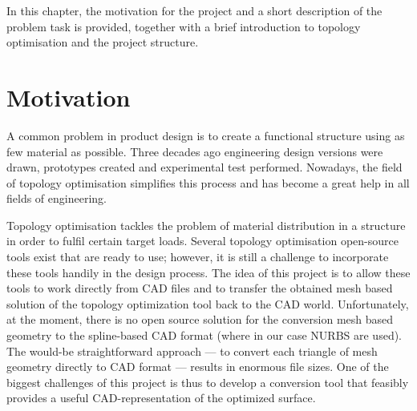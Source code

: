 In this chapter, the motivation for the project and a short description of the problem task is provided, together with a brief introduction to topology optimisation and the project structure.
\section{Motivation}
A common problem in product design is to create a functional structure using as few material as possible. Three decades ago engineering design versions were drawn, prototypes created and experimental test performed. Nowadays, the field of topology optimisation simplifies this process and has become a great help in all fields of engineering. 

Topology optimisation tackles the problem of material distribution in a structure in order to fulfil certain target loads. Several topology optimisation open-source tools exist that are ready to use; however, it is still a challenge to incorporate these tools handily in the design process. The idea of this project is to allow these tools to work directly from \ac{CAD} files and to transfer the obtained mesh based solution of the topology optimization tool back to the \ac{CAD} world. Unfortunately, at the moment, there is no open source solution for the conversion mesh based geometry to the spline-based \ac{CAD} format (where in our case \ac{NURBS} are used). The would-be straightforward approach --- to convert each triangle of mesh geometry directly to \ac{CAD} format --- results in enormous file sizes. One of the biggest challenges of this project is thus to develop a conversion tool that feasibly provides a useful \ac{CAD}-representation of the optimized surface.


%
%

